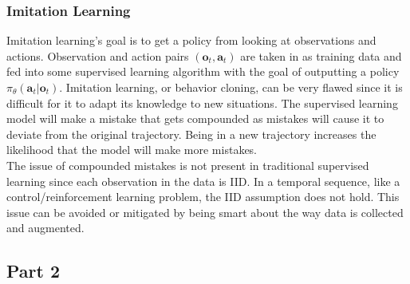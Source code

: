 \subsubsection{Imitation Learning}
Imitation learning's goal is to get a policy from looking at observations and actions. Observation and action pairs $(\textbf{o}_t,\textbf{a}_t)$ are taken in as training data and fed into some supervised learning algorithm with the goal of outputting a policy $\pi_\theta(\textbf{a}_t | \textbf{o}_t )$. Imitation learning, or behavior cloning, can be very flawed since it is difficult for it to adapt its knowledge to new situations. The supervised learning model will make a mistake that gets compounded as mistakes will cause it to deviate from the original trajectory. Being in a new trajectory increases the likelihood that the model will make more mistakes.
\\ 
The issue of compounded mistakes is not present in traditional supervised learning since each observation in the data is IID. In a temporal sequence, like a control/reinforcement learning problem, the IID assumption does not hold. This issue can be avoided or mitigated by being smart about the way data is collected and augmented.

\subsection{Part 2}
